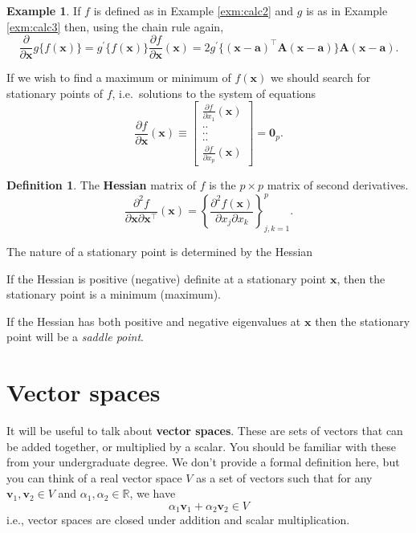 \documentclass[]{book}
\theoremstyle{definition}
\newtheorem{definition}{Definition}[chapter]
\theoremstyle{definition}
\newtheorem{example}{Example}[chapter]
\theoremstyle{definition}
\theoremstyle{remark}
\begin{document}
\begin{example}
\protect\hypertarget{exm:calc4}{}{\label{exm:calc4} }If \(f\) is defined as in Example \ref{exm:calc2} and \(g\) is as in Example \ref{exm:calc3} then, using the chain rule again,
\[
\frac{\partial }{\partial \boldsymbol x} g\{f(\boldsymbol x)\}=g^{\prime} \{f(\boldsymbol x)\}\frac{\partial f}{\partial \boldsymbol x}(\boldsymbol x)
=2 g^{\prime}\{(\boldsymbol x- \boldsymbol a)^\top \boldsymbol A(\boldsymbol x- \boldsymbol a)\}\boldsymbol A(\boldsymbol x-\boldsymbol a).
\]
\end{example}

If we wish to find a maximum or minimum of \(f(\boldsymbol x)\) we should search for stationary points of \(f\),
i.e.~solutions to the system of equations
\[
\frac{\partial f}{\partial \boldsymbol x}(\boldsymbol x)\equiv \left [ \begin{array}{c} \frac{\partial f}{\partial x_1}(\boldsymbol x)\\
 ..\\
 ..\\
 ..\\
 \frac{\partial f}{\partial x_p}(\boldsymbol x)
\end{array} \right ]={\mathbf 0}_p.
\]
\begin{definition}
\protect\hypertarget{def:hessian}{}{\label{def:hessian} }The \textbf{Hessian} matrix of \(f\) is the \(p \times p\) matrix of second derivatives.
\[
\frac{\partial^2f}{\partial \boldsymbol x\partial \boldsymbol x^\top}(\boldsymbol x) =\left \{ \frac{\partial^2 f(\boldsymbol x)}{\partial x_j \partial x_k}\right \}_{j,k=1}^p.
\]
\end{definition}

The nature of a stationary point is determined by the Hessian

If the Hessian is positive (negative) definite at a stationary point \(\boldsymbol x\), then the stationary point is a minimum (maximum).

If the Hessian has both positive and negative eigenvalues at \(\boldsymbol x\) then the stationary point will be a \emph{saddle point}.

\hypertarget{linalg-vecspaces}{%
\section{Vector spaces}\label{linalg-vecspaces}}

It will be useful to talk about \textbf{vector spaces}. These are sets of vectors that can be added together, or multiplied by a scalar. You should be familiar with these from your undergraduate degree. We don't provide a formal definition here, but you can think of a real vector space \(V\) as a set of vectors such that for any \(\boldsymbol v_1, \boldsymbol v_2 \in V\) and \(\alpha_1, \alpha_2 \in \mathbb{R}\), we have
\[\alpha_1 \boldsymbol v_1 + \alpha_2 \boldsymbol v_2 \in V\]
i.e., vector spaces are closed under addition and scalar multiplication.
\end{document}
